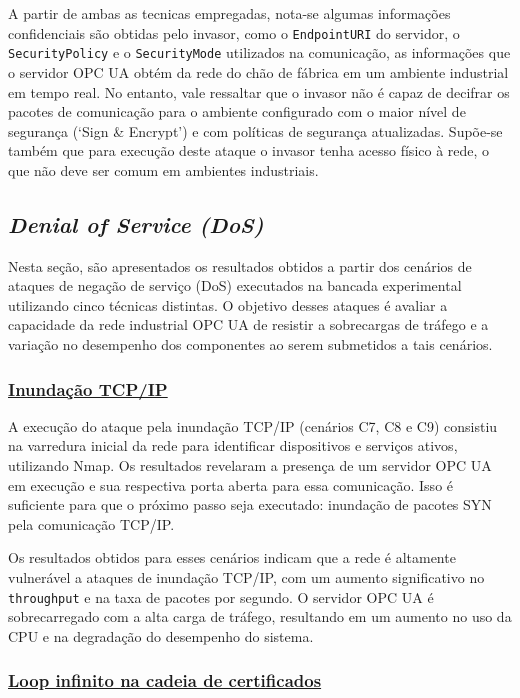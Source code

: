A partir de ambas as tecnicas empregadas, nota-se algumas informações confidenciais são obtidas pelo invasor, como o \texttt{EndpointURI} do servidor, o \texttt{SecurityPolicy} e o \texttt{SecurityMode} utilizados na comunicação,  as informações que o servidor OPC UA obtém da rede do chão de fábrica em um ambiente industrial em tempo real. No entanto, vale ressaltar que o invasor não é capaz de decifrar os pacotes de comunicação para o ambiente configurado com o maior nível de segurança (`Sign \& Encrypt') e com políticas de segurança atualizadas. Supõe-se também que para execução deste ataque o invasor tenha acesso físico à rede, o que não deve ser comum em ambientes industriais.

\subsection{\textit{Denial of Service (DoS)}}

Nesta seção, são apresentados os resultados obtidos a partir dos cenários de ataques de negação de serviço (DoS) executados na bancada experimental utilizando cinco técnicas distintas. O objetivo desses ataques é avaliar a capacidade da rede industrial OPC UA de resistir a sobrecargas de tráfego e a variação no desempenho dos componentes ao serem submetidos a tais cenários.

\subsubsection*{\underline{Inundação TCP/IP}}

A execução do ataque pela inundação TCP/IP (cenários C7, C8 e C9) consistiu na varredura inicial da rede para identificar dispositivos e serviços ativos, utilizando Nmap. Os resultados revelaram a presença de um servidor OPC UA em execução e sua respectiva porta aberta para essa comunicação. Isso é suficiente para que o próximo passo seja executado: inundação de pacotes SYN pela comunicação TCP/IP.

Os resultados obtidos para esses cenários indicam que a rede é altamente vulnerável a ataques de inundação TCP/IP, com um aumento significativo no \texttt{throughput} e na taxa de pacotes por segundo. O servidor OPC UA é sobrecarregado com a alta carga de tráfego, resultando em um aumento no uso da CPU e na degradação do desempenho do sistema. 

\subsubsection*{\underline{Loop infinito na cadeia de certificados}}

